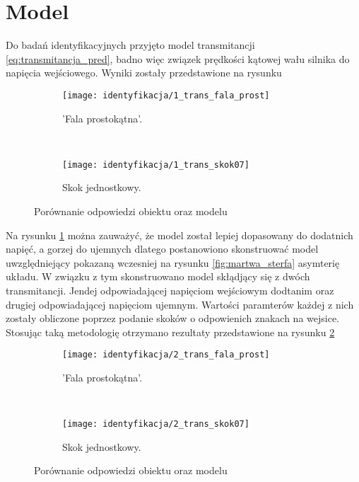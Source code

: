 \section{Model}
Do badań identyfikacyjnych przyjęto model transmitancji \ref{eq:transmitancja_pred}, badno więc związek prędkości kątowej wału silnika do napięcia wejściowego. Wyniki zostały przedstawione na rysunku
\begin{figure}[h]
	\centering
	\begin{subfigure}[b]{0.7\textwidth}
\texttt{[image: identyfikacja/1\_trans\_fala\_prost]}
\centering
\caption{'Fala prostokątna'.}


	\end{subfigure}%
	~ 
	\begin{subfigure}[b]{0.7\textwidth}
	\texttt{[image: identyfikacja/1\_trans\_skok07]}
\centering
\caption{Skok jednostkowy.}

	\end{subfigure}
	\centering
	\caption{Porównanie odpowiedzi obiektu oraz modelu}
	\label{fig:1_trans}
\end{figure}
Na rysunku \ref{fig:1_trans} można zauważyć, że model został lepiej dopasowany do dodatnich napięć, a gorzej do ujemnych dlatego postanowiono skonstruować model uwzględniejący pokazaną wczesniej na rysunku \ref{fig:martwa_sterfa} asymterię układu. W związku z tym skonstruowano model skłądjący się z dwóch transmitancji. Jendej odpowiadającej napięciom wejściowym dodtanim oraz drugiej odpowiadającej napięciom ujemnym.  Wartości paramterów każdej z nich zostały obliczone poprzez podanie skoków o odpowienich znakach na wejsice. Stosując taką metodologię otrzymano rezultaty przedstawione na rysunku \ref{2_trans}


\begin{figure}[h]
	\captionsetup[figure]{justification=centering}
	\centering
	\begin{subfigure}[b]{0.7\textwidth}
		\texttt{[image: identyfikacja/2\_trans\_fala\_prost]}
		\centering
		\caption{'Fala prostokątna'.}
		
	\end{subfigure}%
	~ 
	\begin{subfigure}[b]{0.7\textwidth}
		\texttt{[image: identyfikacja/2\_trans\_skok07]}
		\centering
		\caption{Skok jednostkowy.}
		
	\end{subfigure}
	\centering
	\caption{Porównanie odpowiedzi obiektu oraz modelu}
	\label{2_trans}
\end{figure}

